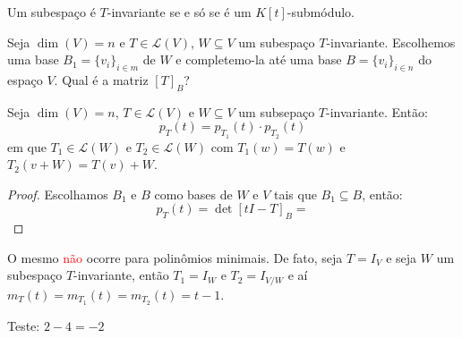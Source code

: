 \documentclass[11pt,twoside,a4paper]{book}
\begin{document}
\begin{observacao}
Um subespaço é $T$-invariante se e só se é um $K[t]$-submódulo.
\end{observacao}

\noindent
Seja $\dim(V)=n$ e $T\in\mathcal{L}(V)$, $W\subseteq V$ um subespaço $T$-invariante. Escolhemos uma base $B_1=\{v_i\}_{i\in m}$ de $W$ e completemo-la até uma base $B=\{v_i\}_{i\in n}$ do espaço $V$. Qual é a matriz $[T]_B$?

\begin{lema}
Seja $\dim(V)=n$, $T\in\mathcal{L}(V)$ e $W\subseteq V$ um subsepaço $T$-invariante. Então:
\[
p_T(t)=p_{T_1}(t)\cdot p_{T_2}(t)
\]
em que $T_1\in\mathcal{L}(W)$ e $T_2\in\mathcal{L}(W)$ com $T_1(w)=T(w)$ e $T_2(v+W)=T(v)+W$.
\end{lema}
\begin{proof}
Escolhamos $B_1$ e $B$ como bases de $W$ e $V$ tais que $B_1\subseteq B$, então:
\[
p_T(t)=\det[tI-T]_B=
\]
\end{proof}

\begin{observacao}
O mesmo \textcolor{red}{não} ocorre para polinômios minimais. De fato, seja $T=I_V$ e seja $W$ um subespaço $T$-invariante, então $T_1=I_W$ e $T_2=I_{V/W}$ e aí $m_T(t)=m_{T_1}(t)=m_{T_2}(t)=t-1$.

Teste: $2- 4=-2$
\end{observacao}

\printindex
\end{document}
